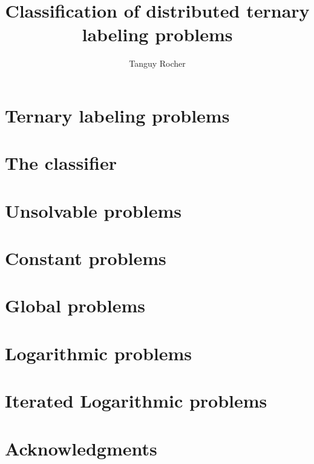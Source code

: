 
\title{Classification of distributed ternary labeling problems}
\author{Tanguy Rocher}



\maketitle

\tableofcontents
\newpage
\chapter{Ternary labeling problems}


\newpage
\chapter{The classifier}


\newpage
\chapter{Unsolvable problems}


\newpage
\chapter{Constant problems}


\newpage
\chapter{Global problems}


\newpage
\chapter{Logarithmic problems}


\newpage
\chapter{Iterated Logarithmic problems}


\chapter{Acknowledgments}




